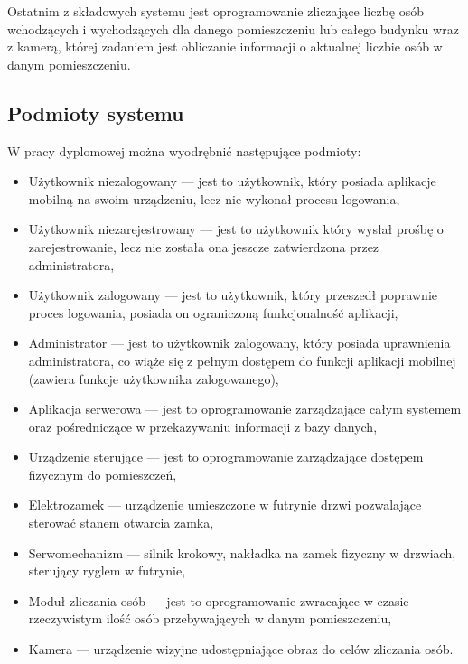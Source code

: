 Ostatnim z składowych systemu jest oprogramowanie zliczające liczbę osób wchodzących i wychodzących dla danego pomieszczeniu lub całego budynku wraz z kamerą, której zadaniem jest obliczanie informacji o aktualnej liczbie osób w danym pomieszczeniu. 

\newpage
\subsection{Podmioty systemu} 
W pracy dyplomowej można wyodrębnić następujące podmioty:
	\begin{itemize}
	\item {Użytkownik niezalogowany} --- jest to użytkownik, który posiada aplikacje mobilną na swoim urządzeniu, lecz nie wykonał procesu logowania,
	\item {Użytkownik niezarejestrowany} --- jest to użytkownik który wysłał prośbę o zarejestrowanie, lecz nie została ona jeszcze zatwierdzona przez administratora,
	\item {Użytkownik zalogowany} --- jest to użytkownik, który przeszedł poprawnie proces logowania, posiada on ograniczoną funkcjonalność aplikacji,
	\item {Administrator} --- jest to użytkownik zalogowany, który posiada uprawnienia administratora, co wiąże się z pełnym dostępem do funkcji aplikacji mobilnej (zawiera funkcje użytkownika zalogowanego),
	\item {Aplikacja serwerowa} --- jest to oprogramowanie zarządzające całym systemem oraz pośredniczące w przekazywaniu informacji z bazy danych,
	\item {Urządzenie sterujące} --- jest to oprogramowanie zarządzające dostępem fizycznym do pomieszczeń,
	\item {Elektrozamek} --- urządzenie umieszczone w futrynie drzwi pozwalające sterować stanem otwarcia zamka,
	\item {Serwomechanizm} --- silnik krokowy, nakładka na zamek fizyczny w drzwiach, sterujący ryglem w futrynie,
	\item {Moduł zliczania osób} --- jest to oprogramowanie zwracające w czasie rzeczywistym ilość osób przebywających w danym pomieszczeniu,
	\item {Kamera} --- urządzenie wizyjne udostępniające obraz do celów zliczania osób.
\end{itemize}